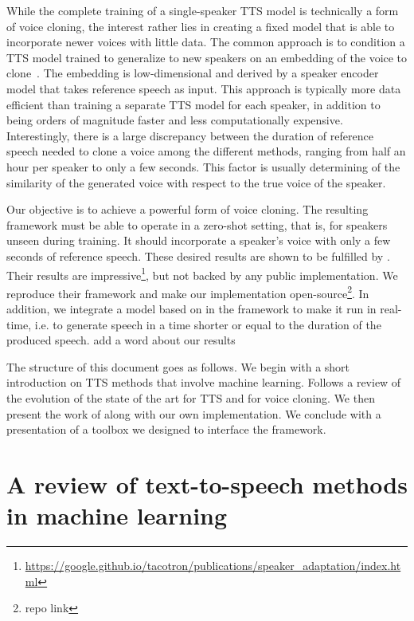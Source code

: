\documentclass[a4paper, oneside, 12pt, english]{article}
\begin{document}
While the complete training of a single-speaker TTS model is technically a form of voice cloning, the interest rather lies in creating a fixed model that is able to incorporate newer voices with little data. The common approach is to condition a TTS model trained to generalize to new speakers on an embedding of the voice to clone~\citep{DeepVoice2, CloningFewSamples, SV2TTS}. The embedding is low-dimensional and derived by a speaker encoder model that takes reference speech as input. This approach is typically more data efficient than training a separate TTS model for each speaker, in addition to being orders of magnitude faster and less computationally expensive. Interestingly, there is a large discrepancy between the duration of reference speech needed to clone a voice among the different methods, ranging from half an hour per speaker to only a few seconds. This factor is usually determining of the similarity of the generated voice with respect to the true voice of the speaker.

Our objective is to achieve a powerful form of voice cloning. The resulting framework must be able to operate in a zero-shot setting, that is, for speakers unseen during training. It should incorporate a speaker's voice with only a few seconds of reference speech. These desired results are shown to be fulfilled by \citep{SV2TTS}. Their results are impressive\footnote{\url{https://google.github.io/tacotron/publications/speaker_adaptation/index.html}}, but not backed by any public implementation. We reproduce their framework and make our implementation open-source\footnote{\color{red} repo link}. In addition, we integrate a model based on \citep{WaveRNN} in the framework to make it run in real-time, i.e. to generate speech in a time shorter or equal to the duration of the produced speech. \color{red} add a word about our results \color{black}

The structure of this document goes as follows. We begin with a short introduction on TTS methods that involve machine learning. Follows a review of the evolution of the state of the art for TTS and for voice cloning. We then present the work of \citep{SV2TTS} along with our own implementation. We conclude with a presentation of a toolbox we designed to interface the framework.


\section{A review of text-to-speech methods in machine learning}
\end{document}
